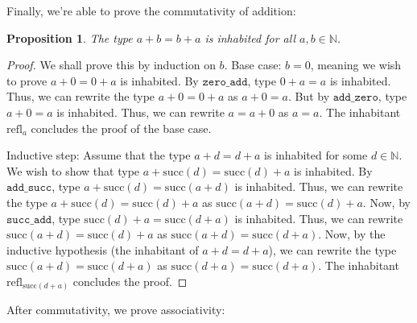 \documentclass[12pt]{article}
\newtheorem{proposition}{Proposition}[section]
\theoremstyle{definition}
\theoremstyle{remark}
\begin{document}
Finally, we're able to prove the commutativity of addition:

\begin{proposition}\label{prop_comm}
  The type $a + b = b + a$ is inhabited for all $a, b \in \mathbb{N}$.
\end{proposition}
\begin{proof}
  We shall prove this by induction on $b$. Base case: $b = 0$, meaning we wish to prove $a + 0 = 0 + a$ is inhabited. By $\texttt{zero\_add}$, type $0 + a = a$ is inhabited. Thus, we can rewrite the type $a + 0 = 0 + a$ as $a + 0 = a$. But by $\texttt{add\_zero}$, type $a + 0 = a$ is inhabited. Thus, we can rewrite $a = a + 0$ as $a = a$. The inhabitant $\text{refl}_a$ concludes the proof of the base case. 
  
  Inductive step: Assume that the type $a + d = d + a$ is inhabited for some $d \in \mathbb{N}$. We wish to show that type $a + \text{succ}(d) = \text{succ}(d) + a$ is inhabited. By $\texttt{add\_succ}$, type $a + \text{succ}(d) = \text{succ}(a + d)$ is inhabited. Thus, we can rewrite the type $a + \text{succ}(d) = \text{succ}(d) + a$ as $\text{succ}(a+d) = \text{succ}(d) + a$. Now, by $\texttt{succ\_add}$, type $\text{succ}(d) + a = \text{succ}(d+a)$ is inhabited. Thus, we can rewrite $\text{succ}(a+d) = \text{succ}(d) + a$ as $\text{succ}(a+d) = \text{succ}(d+a)$. Now, by the inductive hypothesis (the inhabitant of $a+d = d+a$), we can rewrite the type $\text{succ}(a+d) = \text{succ}(d+a)$ as $\text{succ}(d+a) = \text{succ}(d+a)$. The inhabitant $\text{refl}_{\text{succ}(d+a)}$ concludes the proof. 
\end{proof} 

After commutativity, we prove associativity:
\end{document}
